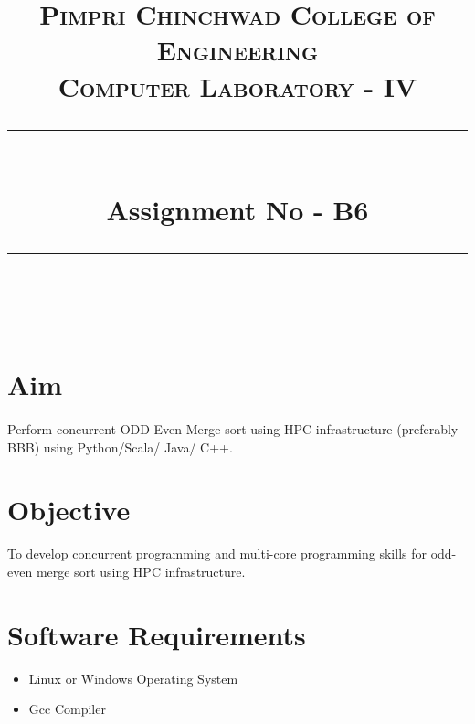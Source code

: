 \documentclass[a4paper,12pt]{article}
\title{
	\normalfont \normalsize 
	\textsc{Pimpri Chinchwad College of Engineering \\ 
		Computer Laboratory - IV} \\
	[10pt] 
	\rule{\linewidth}{0.5pt} \\[6pt] 
	\huge Assignment No - B6 \\
	\rule{\linewidth}{2pt}  \\[10pt]
}
\author{}
\date{\normalsize}
\newenvironment{codefont}{\fontfamily{ccr}\selectfont}{\par}
\begin{document}
\maketitle

\section{Aim}
	\paragraph{} Perform concurrent ODD-Even Merge sort using HPC infrastructure (preferably BBB) using Python/Scala/ Java/ C++.
	
\section{Objective}
	To develop concurrent programming and multi-core programming skills for odd-even merge sort using HPC infrastructure.  
	
\section{Software Requirements}
	\begin{itemize}
		\item Linux or Windows Operating System
		\item Gcc Compiler
	\end{itemize}
	
\end{document}
